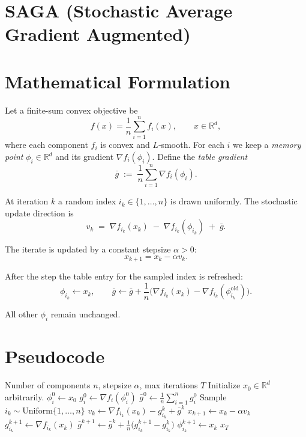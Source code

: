 \documentclass{article}
\newcommand{\R}{\mathbb{R}}
\begin{document}
\section*{SAGA (Stochastic Average Gradient Augmented) }

\section*{Mathematical Formulation}
Let a finite-sum convex objective be
\[
f(x)=\frac{1}{n}\sum_{i=1}^{n}f_i(x), \qquad x\in\R^{d},
\]
where each component $f_i$ is convex and $L$‑smooth.  
For each $i$ we keep a \emph{memory point} $\phi_i\in\R^{d}$ and its gradient
$\nabla f_i(\phi_i)$. Define the \emph{table gradient}
\[
\bar g \;:=\; \frac{1}{n}\sum_{i=1}^{n}\nabla f_i(\phi_i).
\]

At iteration $k$ a random index $i_k\in\{1,\dots,n\}$ is drawn uniformly.
The stochastic update direction is
\[
v_k \;=\; \nabla f_{i_k}(x_k)\;-\;\nabla f_{i_k}(\phi_{i_k})\;+\;\bar g .
\tag{1}
\]

The iterate is updated by a constant stepsize $\alpha>0$:
\[
x_{k+1}=x_k-\alpha v_k .
\tag{2}
\]

After the step the table entry for the sampled index is refreshed:
\[
\phi_{i_k}\leftarrow x_k,\qquad
\bar g\leftarrow \bar g+\frac{1}{n}\bigl(\nabla f_{i_k}(x_k)-\nabla f_{i_k}(\phi_{i_k}^{\text{old}})\bigr).
\tag{3}
\]

All other $\phi_i$ remain unchanged.

\section*{Pseudocode}
\begin{algorithm}[H]
\caption{SAGA}
\begin{algorithmic}[1]
\Require Number of components $n$, stepsize $\alpha$, max iterations $T$
\State Initialize $x_0\in\R^{d}$ arbitrarily.
    \State $\phi_i^0 \gets x_0$ 
    \State $g_i^0 \gets \nabla f_i(\phi_i^0)$
\EndFor
\State $\bar g^0 \gets \frac1n\sum_{i=1}^{n} g_i^0$
    \State Sample $i_k\sim\text{Uniform}\{1,\dots,n\}$
    \State $v_k \gets \nabla f_{i_k}(x_k)-g_{i_k}^k+\bar g^k$
    \State $x_{k+1}\gets x_k-\alpha v_k$
    \State $g_{i_k}^{k+1}\gets \nabla f_{i_k}(x_k)$
    \State $\bar g^{k+1}\gets \bar g^k+\frac1n\bigl(g_{i_k}^{k+1}-g_{i_k}^k\bigr)$
    \State $\phi_{i_k}^{k+1}\gets x_k$ 
\EndFor
\State \Return $x_T$
\end{algorithmic}
\end{algorithm}
\end{document}
